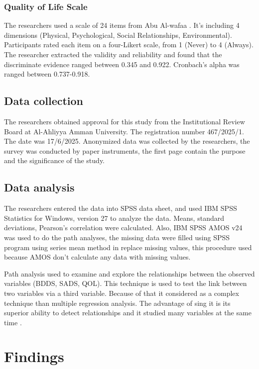 \documentclass[10pt]{NSP1}
\begin{document}
	\subsubsection{Quality of Life Scale}
	The researchers used a scale of 24 items from Abu Al-wafaa \cite{AbuAlwafaa2024}. It's including 4 dimensions (Physical, Psychological, Social Relationships, Environmental). Participants rated each item on a four-Likert scale, from 1 (Never) to 4 (Always). The researcher extracted the validity and reliability and found that the discriminate evidence ranged between 0.345 and 0.922. Cronbach's alpha was ranged between 0.737-0.918.
	
	\subsection{Data collection}
	The researchers obtained approval for this study from the Institutional Review Board at Al-Ahliyya Amman University. The registration number 467/2025/1. The date was 17/6/2025. Anonymized data was collected by the researchers, the survey was conducted by paper instruments, the first page contain the purpose and the significance of the study.
	
	\subsection{Data analysis}
	The researchers entered the data into SPSS data sheet, and used IBM SPSS Statistics for Windows, version 27 to analyze the data. Means, standard deviations, Pearson's correlation were calculated. Also, IBM SPSS AMOS v24 was used to do the path analyses, the missing data were filled using SPSS program using series mean method in replace missing values, this procedure used because AMOS don't calculate any data with missing values.
	
	Path analysis used to examine and explore the relationships between the observed variables (BDDS, SADS, QOL). This technique is used to test the link between two variables via a third variable. Because of that it considered as a complex technique than multiple regression analysis. The advantage of sing it is its superior ability to detect relationships and it studied many variables at the same time \cite{Garson2014}.
	
	\section{Findings}
	
\end{document}
